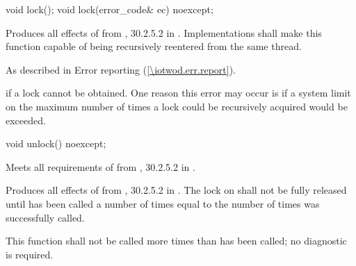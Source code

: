 \begin{itemdecl}
void lock();
void lock(error_code& ec) noexcept;
\end{itemdecl}
\begin{itemdescr}
	\pnum
	\effects
	Produces all effects of  from , 
	30.2.5.2 in \CppXIV. Implementations shall make this function capable of 
	being recursively reentered from the same thread.
	
	\pnum
	\throws
	As described in Error reporting (\ref{\iotwod.err.report}).
	
	\pnum
	\errors
	 if a lock cannot be obtained.
	\enternote
	One reason this error may occur is if a system limit on the maximum number of times a lock could be recursively acquired would be exceeded.
	\exitnote
\end{itemdescr}

\begin{itemdecl}
void unlock() noexcept;
\end{itemdecl}
\begin{itemdescr}
	\pnum
	\requires
	Meets all requirements of  from , 
	30.2.5.2 in \CppXIV.
	
	\pnum
	\effects
	Produces all effects of  from , 
	30.2.5.2 in \CppXIV. The lock on  shall not be fully released 
	until  has been called a number of times equal to the 
	number of times  was successfully called.
	
	\pnum
	\remark
	This function shall not be called more times than  has been called; no diagnostic is required.

\end{itemdescr}
